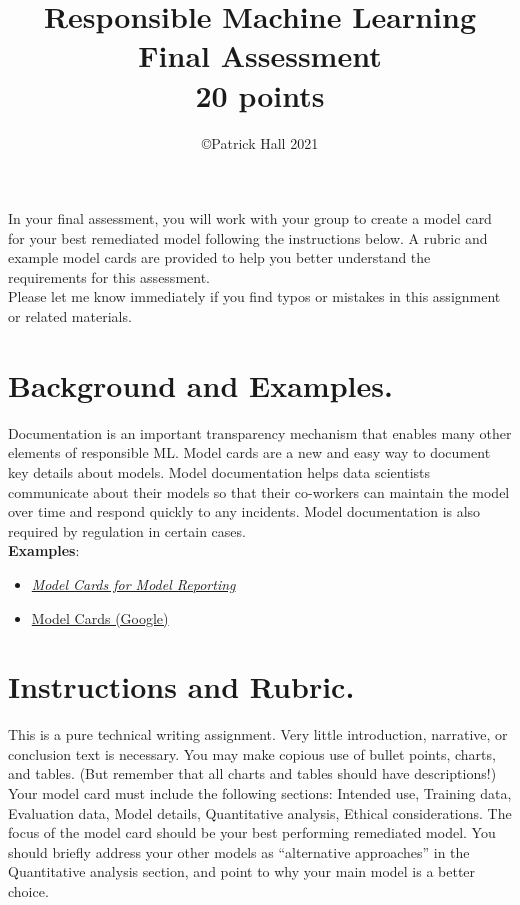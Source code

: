 \documentclass[fleqn]{article}
\title{Responsible Machine Learning\\\Large{Final Assessment}\\\Large{20 points}}
\author{\copyright Patrick Hall 2021}
\begin{document}
\maketitle

\noindent In your final assessment, you will work with your group to create a model card for your best remediated model following the instructions below. A rubric and example model cards are provided to help you better understand the requirements for this assessment.\\

\noindent Please let me know immediately if you find typos or mistakes in this assignment or related materials. 

\section{Background and Examples.}

Documentation is an important transparency mechanism that enables many other elements of responsible ML. Model cards are a new and easy way to document key details about models. Model documentation helps data scientists communicate about their models so that their co-workers can maintain the model over time and respond quickly to any incidents. Model documentation is also required by regulation in certain cases.\\ 

\noindent\textbf{Examples}:
\begin{itemize}
	\item \href{https://arxiv.org/pdf/1810.03993.pdf}{\textit{Model Cards for Model Reporting}}
	\item \href{https://modelcards.withgoogle.com/about}{Model Cards (Google)}
\end{itemize}

\section{Instructions and Rubric.}

This is a pure technical writing assignment. Very little introduction, narrative, or conclusion text is necessary. You may make copious use of bullet points, charts, and tables. (But remember that all charts and tables should have descriptions!)\\

\noindent Your model card must include the following sections: Intended use, Training data,
Evaluation data, Model details, Quantitative analysis, Ethical considerations. The focus of the model card should be your best performing remediated model. You should briefly address your other models as ``alternative approaches'' in the Quantitative analysis section, and point to why your main model is a better choice.\\
 
\end{document}
